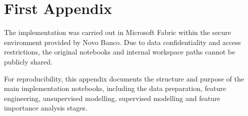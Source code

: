 \chapter{First Appendix}

The implementation was carried out in Microsoft Fabric within the secure environment provided by Novo Banco. Due to data confidentiality and access restrictions, the original notebooks and internal workspace paths cannot be publicly shared. 

For reproducibility, this appendix documents the structure and purpose of the main implementation notebooks, including the data preparation, feature engineering, unsupervised modelling, supervised modelling and feature importance analysis stages.